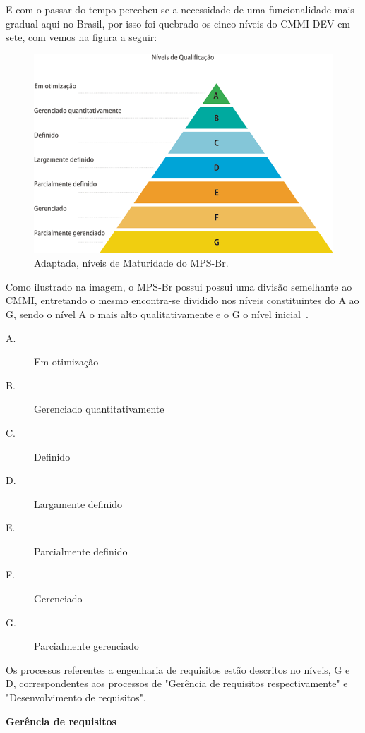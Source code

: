 E com o passar do tempo percebeu-se a necessidade de uma funcionalidade mais gradual aqui no Brasil, por isso foi quebrado os cinco níveis do CMMI-DEV em sete, com vemos na figura a seguir:
  \begin{figure}[!htbp]
    \centering
    \includegraphics[scale=0.5]{figuras/650x432xniveis_de_qualificacao}
    \caption[Níveis de Maturidade do MPS-Br]{Adaptada, níveis de Maturidade do MPS-Br. \footnotemark}
    \label{niveis-maturidade-mps-br}
  \end{figure}
  
Como ilustrado na imagem, o MPS-Br possui possui uma divisão semelhante ao CMMI, entretando o mesmo encontra-se dividido nos níveis constituintes do A ao G, sendo o nível A o mais alto qualitativamente e o G o nível inicial~\cite{modelosmaturidade}.	
\begin{description}
\item[A.] Em otimização
\item[B.] Gerenciado quantitativamente
\item[C.] Definido
\item[D.] Largamente definido
\item[E.] Parcialmente definido
\item[F.] Gerenciado
\item[G.] Parcialmente gerenciado	
\end{description}			

Os processos referentes a engenharia de requisitos estão descritos no níveis, G e D, correspondentes aos processos de "Gerência de requisitos respectivamente" e "Desenvolvimento de requisitos".

\textbf{Gerência de requisitos}

